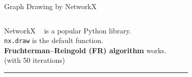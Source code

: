 \documentclass[dvipdfmx,13pt,aspectratio=169]{beamer}
\newcommand{\red}[1]{\textcolor{red}{#1}}
\newif\ifShowHidden
\begin{document}
\begin{frame}{Graph Drawing by NetworkX}
  \begin{columns}
    \begin{column}{0.62\columnwidth}
      \large{%
        NetworkX ~\cite{hagberg2008exploring} is a popular Python library.\\
        \texttt{nx.draw} is the default function.\\
        \large{\textbf{Fruchterman--Reingold (FR) algorithm}} works.\\
        (with 50 iterations)
      }
      \begin{center}
        \rule{0.8\columnwidth}{0.4pt}
      \end{center}
      \Large{
        \\
        \\
        \uncover<3->{$\abs{V}=500$: \red{11.5} sec / \red{WHAT IS THIS???}}
      }
    \end{column}
    \begin{column}{0.38\columnwidth}
      \begin{figure}[htbp]
        \centering

\end{figure}
\end{column}
\end{columns}
\end{frame}
\end{document}
